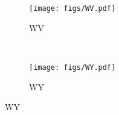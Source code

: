 \begin{figure}[tp]
	 \centering
	 \begin{subfigure}[b]{0.49\textwidth}
	 \centering
	 \texttt{[image: figs/WV.pdf]}
	 \caption{ WV }
	 \end{subfigure}
	 ~
	 \begin{subfigure}[b]{0.49\textwidth}
	 \centering
	 \texttt{[image: figs/WY.pdf]}
	 \caption{ WY }
	 \end{subfigure}
\end{figure}
